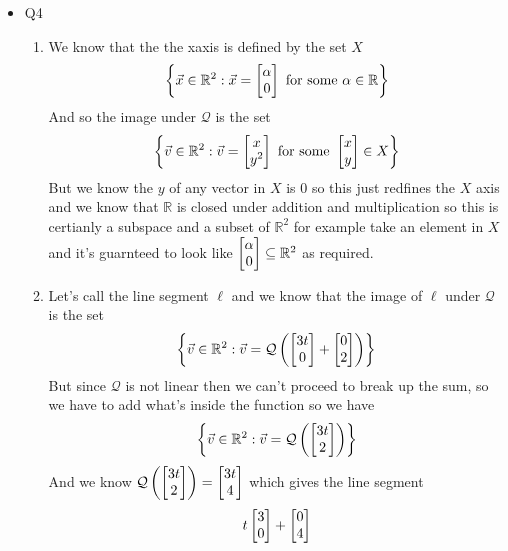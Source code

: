 \documentclass[11pt]{book}
\begin{document}
\begin{itemize}
\begin{enumerate}
    \end{enumerate}
    \item Q4
    \begin{enumerate}
        \item We know that the the xaxis is defined by the set $X$ 
            \[
            \left\{ \vec{x} \in \mathbb{R}^2 :\vec{x} = \begin{bmatrix} \alpha  \\ 0 \end{bmatrix} \text{ for some  } \alpha \in \mathbb{R}  \right\} 
            \]
            And so the image under $\mathcal{Q} $ is the set 
            \begin{gather*}
                \left\{ \vec{v} \in \mathbb{R}^2 :\vec{v} = \begin{bmatrix} x \\ y^2  \end{bmatrix} \text{ for some  } \begin{bmatrix} x \\ y \end{bmatrix} \in X \right\} 
            \end{gather*}
            But we know the $y$ of any vector in $X$ is 0 so this just redfines the $X$ axis and we know that $\mathbb{R} $ is closed under addition and multiplication so this is certianly a subspace and a subset of $\mathbb{R}^2 $ for example take an element in $X$ and it's guarnteed to look like $\begin{bmatrix} \alpha  \\ 0 \end{bmatrix} \subseteq \mathbb{R}^2 $ as required.
        \item Let's call the line segment $\ell $ and we know that the image of $\ell $ under $\mathcal{Q} $ is the set
            \[
                \left\{ \vec{v} \in \mathbb{R} ^2 :\vec{v} = \mathcal{Q}\left(\begin{bmatrix} 3t \\ 0 \end{bmatrix}  + \begin{bmatrix} 0 \\ 2 \end{bmatrix} \right)  \right\} 
            \]
            But since $\mathcal{Q} $ is not linear then we can't proceed to break up the sum, so we have to add what's inside the function so we have
            \[
            \left\{ \vec{v} \in \mathbb{R} ^2 :\vec{v} = \mathcal{Q}\left(\begin{bmatrix} 3t \\ 2 \end{bmatrix} \right)  \right\} 
            \]
            And we know $\mathcal{Q} \left(\begin{bmatrix} 3t \\ 2 \end{bmatrix} \right) = \begin{bmatrix} 3t \\ 4 \end{bmatrix} $ which gives the line segment 
            \[
            t\begin{bmatrix} 3 \\ 0 \end{bmatrix}  + \begin{bmatrix} 0 \\ 4 \end{bmatrix} 
            \]
            

\end{enumerate}
\end{itemize}
\end{document}

